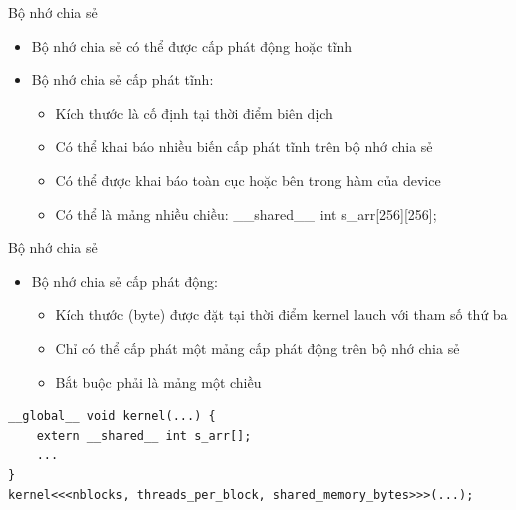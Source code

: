 \documentclass[10pt]{beamer}
\theoremstyle{remark}
\numberwithin{algocf}{section}
\numberwithin{equation}{section}
\numberwithin{dl}{section}
\numberwithin{figure}{section}
\begin{document}
\begin{frame}{Bộ nhớ chia sẻ}
    \begin{itemize}
        \item Bộ nhớ chia sẻ có thể được cấp phát động hoặc tĩnh
        \item Bộ nhớ chia sẻ cấp phát tĩnh:
        \begin{itemize}
            \item Kích thước là cố định tại thời điểm biên dịch
            \item Có thể khai báo nhiều biến cấp phát tĩnh trên bộ nhớ chia sẻ
            \item Có thể được khai báo toàn cục hoặc bên trong hàm của device
            \item Có thể là mảng nhiều chiều:
            \_\_shared\_\_ int s\_arr[256][256];
        \end{itemize}
    \end{itemize}
\end{frame}

\begin{frame}[fragile]{Bộ nhớ chia sẻ}
    \begin{itemize}
        \item Bộ nhớ chia sẻ cấp phát động:
        \begin{itemize}
            \item Kích thước (byte) được đặt tại thời điểm kernel lauch với tham số thứ ba 
            \item Chỉ có thể cấp phát một mảng cấp phát động trên bộ nhớ chia sẻ
            \item Bắt buộc phải là mảng một chiều
        \end{itemize}
    \end{itemize}
    \begin{verbatim}
__global__ void kernel(...) {
    extern __shared__ int s_arr[];
    ...
}
kernel<<<nblocks, threads_per_block, shared_memory_bytes>>>(...);
    \end{verbatim}
\end{frame}
\end{document}
